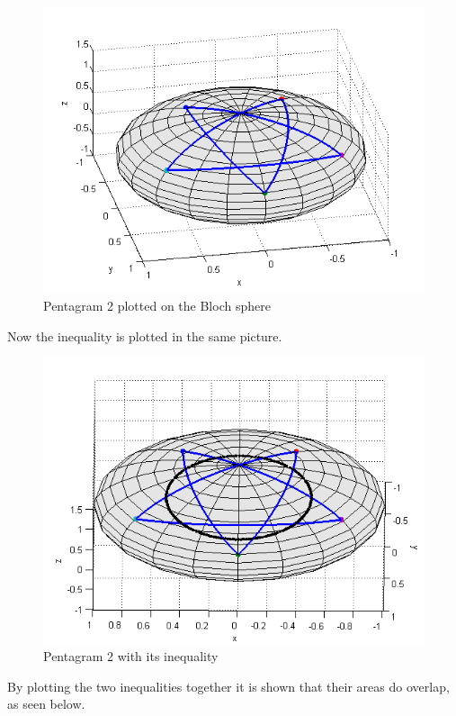 \documentclass[
  utf8,%
  parskip,%
  largesmallcaps,intlimits,widermath,%
  sharecounter,nobreak,definition=marks,%
  noparts%
]{rtthesis}
\begin{document}
\begin{figure}[H]
\begin{center}
\includegraphics[scale=0.6]{penta2.png}
\caption{Pentagram 2 plotted on the Bloch sphere}
\label{fig:penta2}
\end{center}
\end{figure}
Now the inequality is plotted in the same picture.
\begin{figure}[H]
\begin{center}
\includegraphics[scale=0.6]{sphere2ine.png}
\caption{Pentagram 2 with its inequality}
\end{center}
\end{figure}
By plotting the two inequalities together it is shown that their areas do overlap, as seen below.
\end{document}

